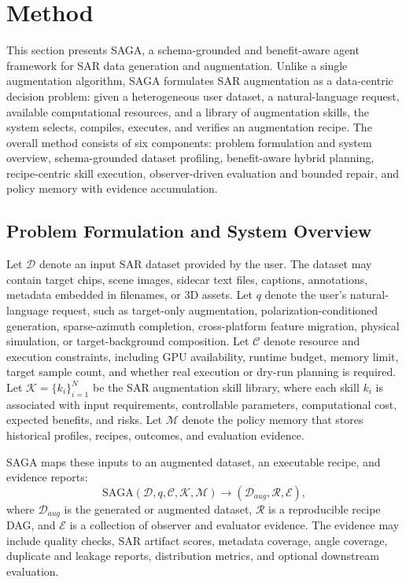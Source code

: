 \section{Method}
\label{sec:method}

This section presents SAGA, a schema-grounded and benefit-aware agent framework for SAR data generation and augmentation.
Unlike a single augmentation algorithm, SAGA formulates SAR augmentation as a data-centric decision problem: given a heterogeneous user dataset, a natural-language request, available computational resources, and a library of augmentation skills, the system selects, compiles, executes, and verifies an augmentation recipe.
The overall method consists of six components: problem formulation and system overview, schema-grounded dataset profiling, benefit-aware hybrid planning, recipe-centric skill execution, observer-driven evaluation and bounded repair, and policy memory with evidence accumulation.

\subsection{Problem Formulation and System Overview}
\label{subsec:problem_overview}

Let $\mathcal{D}$ denote an input SAR dataset provided by the user.
The dataset may contain target chips, scene images, sidecar text files, captions, annotations, metadata embedded in filenames, or 3D assets.
Let $q$ denote the user's natural-language request, such as target-only augmentation, polarization-conditioned generation, sparse-azimuth completion, cross-platform feature migration, physical simulation, or target-background composition.
Let $\mathcal{C}$ denote resource and execution constraints, including GPU availability, runtime budget, memory limit, target sample count, and whether real execution or dry-run planning is required.
Let $\mathcal{K}=\{k_i\}_{i=1}^{N}$ be the SAR augmentation skill library, where each skill $k_i$ is associated with input requirements, controllable parameters, computational cost, expected benefits, and risks.
Let $\mathcal{M}$ denote the policy memory that stores historical profiles, recipes, outcomes, and evaluation evidence.

SAGA maps these inputs to an augmented dataset, an executable recipe, and evidence reports:
\begin{equation}
\mathrm{SAGA}(\mathcal{D}, q, \mathcal{C}, \mathcal{K}, \mathcal{M})
\rightarrow
(\mathcal{D}_{aug}, \mathcal{R}, \mathcal{E}),
\label{eq:saga_mapping}
\end{equation}
where $\mathcal{D}_{aug}$ is the generated or augmented dataset, $\mathcal{R}$ is a reproducible recipe DAG, and $\mathcal{E}$ is a collection of observer and evaluator evidence.
The evidence may include quality checks, SAR artifact scores, metadata coverage, angle coverage, duplicate and leakage reports, distribution metrics, and optional downstream evaluation.

